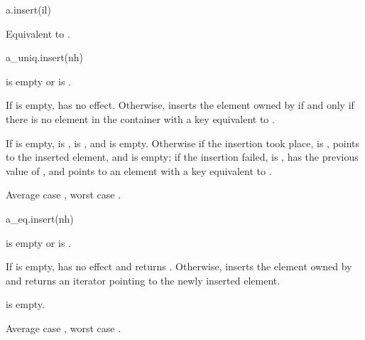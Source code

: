 %
\begin{itemdecl}
a.insert(il)
\end{itemdecl}

\begin{itemdescr}
\pnum
\effects
Equivalent to .
\end{itemdescr}

%
\begin{itemdecl}
a_uniq.insert(nh)
\end{itemdecl}

\begin{itemdescr}
\pnum
\result
{}

\pnum
\expects
{} is empty or
 is .

\pnum
\effects
If  is empty, has no effect.
Otherwise, inserts the element owned by  if and only if
there is no element in the container with a key equivalent to .

\pnum
\ensures
If  is empty,  is ,
 is , and  is empty.
Otherwise if the insertion took place,  is ,
 points to the inserted element, and  is empty;
if the insertion failed,  is ,
 has the previous value of , and 
points to an element with a key equivalent to .

\pnum
\complexity
Average case , worst case .
\end{itemdescr}

%
\begin{itemdecl}
a_eq.insert(nh)
\end{itemdecl}

\begin{itemdescr}
\pnum
\result
{}

\pnum
\expects
{} is empty or
 is .

\pnum
\effects
If  is empty, has no effect and returns .
Otherwise, inserts the element owned by  and
returns an iterator  pointing to the newly inserted element.

\pnum
\ensures
{} is empty.

\pnum
\complexity
Average case , worst case .
\end{itemdescr}


